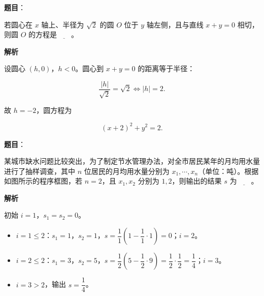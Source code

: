 \begin{answer}

\textbf{题目}：

若圆心在 $x$ 轴上、半径为 $\sqrt2$ 的圆 $O$ 位于 $y$ 轴左侧，且与直线 $x+y=0$ 相切，则圆 $O$ 的方程是$\underline{\qquad}$。

\textbf{解析}

设圆心 $(h,0)$，$h<0$。圆心到 $x+y=0$ 的距离等于半径：

\nopagebreak[4]
\[\frac{|h|}{\sqrt2}=\sqrt2\iff |h|=2.\]

故 $h=-2$，圆方程为

\nopagebreak[4]
\[(x+2)^2+y^2=2.\]


\end{answer}
\begin{answer}

\textbf{题目}：

某城市缺水问题比较突出，为了制定节水管理办法，对全市居民某年的月均用水量进行了抽样调查，其中 $n$ 位居民的月均用水量分别为 $x_1,\cdots,x_n$（单位：吨）。根据如图所示的程序框图，若 $n=2$，且 $x_1,x_2$ 分别为 $1,2$，则输出的结果 $s$ 为$\underline{\qquad}$。
\nopagebreak[4]
\begin{center}\end{center}
\nopagebreak[4]
\textbf{解析}

初始 $i=1$，$s_1=s_2=0$。

\begin{itemize}
\item $i=1\leqslant2$：$s_1=1$，$s_2=1$，$s=\dfrac11\left(1-\dfrac11\cdot1\right)=0$；$i=2$。
\item $i=2\leqslant2$：$s_1=3$，$s_2=5$，$s=\dfrac12\left(5-\dfrac12\cdot9\right)=\dfrac12\cdot\dfrac12=\dfrac14$；$i=3$。
\item $i=3>2$，输出 $s=\dfrac14$。
\end{itemize}


\end{answer}
